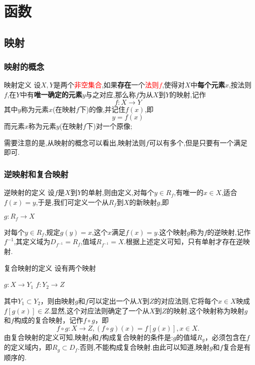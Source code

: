 \documentclass[12pt, a4paper, oneside, UTF8]{ctexbook}  %
\begin{document}
% 
\else
\fi
\chapter{函数}
\section{映射}
\subsection{映射的概念}
\begin{defn}{映射定义}{}
    设$X,Y$是两个\textcolor{red}{非空集合},如果\textbf{存在}一个\textcolor{red}{法则$f$},使得对$X$中\textbf{每个元素}$x$,按法则$f$,在$Y$中有\textbf{唯一确定的元素}$y$与之对应,那么称$f$为从$X$到$Y$的映射,记作
    $$
        f:X \to Y
    $$
    其中$y$称为元素$x$(在映射$f$下)的像,并记住$f(x)$,即
    $$
        y=f(x)
    $$
    而元素$x$称为元素$y$(在映射$f$下)对一个原像;
\end{defn}
需要注意的是,从映射的概念可以看出,映射法则$f$可以有多个,但是只要有一个满足即可.
\subsection{逆映射和复合映射}
\begin{defn}{逆映射的定义}{}
    设$f$是$X$到$Y$的单射,则由定义,对每个$y \in R_f$,有唯一的$x \in X$,适合$f(x)=y$,于是,我们可定义一个从$R_f$到$X$的新映射$g$,即
    \begin{center}
        $g: R_f \to X$
    \end{center}
    对每个$y \in R_f$,规定$g(y)=x$,这个$x$满足$f(x)=y$.这个映射$g$称为$f$的逆映射,记作$f^{-1}$,其定义域为$D_{f^{-1}}=R_f$,值域$R_{f^{-1}}=X$.根据上述定义可知，只有单射才存在逆映射.
\end{defn}
\begin{defn}{复合映射的定义}{}
    设有两个映射
    \begin{center}
        $g: X \to Y_1$ \qquad $f:Y_2 \to Z$
    \end{center}
    其中$Y_1 \subset Y_2$，则由映射$g$和$f$可以定出一个从$X$到$Z$的对应法则,它将每个$x \in X$映成$f[g(x)] \in Z$.显然,这个对应法则确定了一个从$X$到$Z$的映射,这个映射称为映射$g$和$f$构成的复合映射，记作$f \circ g$，即
    $$
        f\circ g:X\to Z,(f\circ g)(x)=f[g(x)],x\in X.
    $$
    由复合映射的定义可知,映射$g$和$f$构成复合映射的条件是:$g$的值域$R_g$，必须包含在$f$的定义域内，即$R_g \subset D_f$.否则,不能构成复合映射.由此可以知道,映射$g$和$f$复合是有顺序的.
\end{defn}
\end{document}

